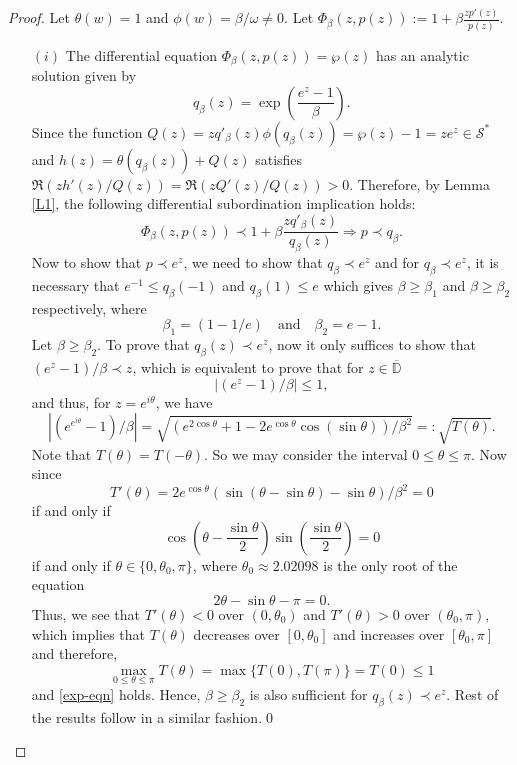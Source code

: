 \documentclass[12pt, reqno]{amsart}
\numberwithin{equation}{section}
\theoremstyle{plain}
\theoremstyle{definition}
\theoremstyle{remark}
\begin{document}
\begin{proof}
	Let $\theta(w)=1$ and $\phi(w)={\beta}/{\omega}\neq0$. Let 
	$	\Phi_\beta(z, p(z)):=1+\beta \frac{zp'(z)}{p(z)}. $
	\begin{itemize}
		\item [$(i)$] The differential equation $\Phi_\beta(z, p(z))=\wp(z)$ has an analytic solution given by
		\begin{equation*}
		q_{\beta}(z)=\exp\left(\frac{e^z-1}{\beta}\right).
		\end{equation*}
		Since the function 
		$Q(z)=zq'_{\beta}(z)\phi(q_{\beta}(z))=\wp(z)-1=ze^z\in\mathcal{S}^{*}$
		and	$h(z)=\theta(q_{\beta}(z))+Q(z)$ satisfies  
		$\Re(zh'(z)/Q(z))=\Re(zQ'(z)/Q(z))>0.$ 
		Therefore, by Lemma \ref{L1}, the following differential subordination implication holds:
		$$\Phi_\beta(z, p(z))\prec 1+\beta \frac{zq'_{\beta}(z)}{q_{\beta}(z)}\Rightarrow p\prec q_{\beta}.$$
		Now to show that $p\prec e^z$, we need to show that $q_{\beta}\prec e^z$ and for $q_{\beta} \prec e^z$, it is necessary that  $e^{-1}\leq q_{\beta}(-1)$ and $q_{\beta}(1)\leq e$ which gives $\beta\geq\beta_1$ and $\beta\geq\beta_2$ respectively, where
		$$\beta_1= (1-1/e) \quad\text{and}\quad \beta_2=e-1.$$
		Let $\beta\geq\beta_2$. To prove that $q_{\beta}(z) \prec e^z$, now it only suffices to show that $(e^z-1)/{\beta} \prec z$, which is equivalent to prove that for $z\in \mathbb{\overline{D}}$
		\begin{equation}\label{exp-eqn}
		|(e^z-1)/{\beta}|\leq1,
		\end{equation}
		and thus, for $z=e^{i\theta}$, we have
		\begin{equation*}
		|(e^{e^{i\theta}}-1)/{\beta}|= \sqrt{(e^{2\cos\theta}+1-2e^{\cos\theta}\cos(\sin\theta))/{\beta}^2}=:\sqrt{T(\theta)}.
		\end{equation*}
		Note that $T(\theta)=T(-\theta)$. So we may consider the interval $0\leq\theta\leq\pi$. Now since 
		$$T'(\theta)=2e^{\cos\theta}(\sin(\theta-\sin\theta)-\sin\theta)/{\beta}^2=0$$
		if and only if 
		$$\cos\left(\theta-\frac{\sin\theta}{2}\right)\sin{\left(\frac{\sin\theta}{2}\right)}=0$$
		if and only if $\theta\in \{0, \theta_0, \pi\}$, where $\theta_0\approx2.02098$ is the only root of the equation $$2\theta-\sin\theta-\pi=0.$$ Thus, we see that $T'(\theta)<0$ over $(0,\theta_0)$ and $T'(\theta)>0$ over $(\theta_0, \pi)$, which implies that $T(\theta)$ decreases over $[0,\theta_0]$ and increases over $[\theta_0,\pi]$ and therefore, 
		$$\max_{0\leq\theta\leq\pi} T(\theta)= \max\{T(0), T(\pi)\}=T(0)\leq1$$ and \eqref{exp-eqn} holds.
		Hence, $\beta\geq\beta_2$ is also sufficient for $q_{\beta}(z)\prec e^z$. Rest of the results follow in a similar fashion.\qed
	\end{itemize}	
\end{proof}
\end{document}

